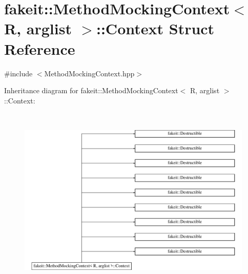 \hypertarget{structfakeit_1_1MethodMockingContext_1_1Context}{}\section{fakeit\+::Method\+Mocking\+Context$<$ R, arglist $>$\+::Context Struct Reference}
\label{structfakeit_1_1MethodMockingContext_1_1Context}


{\ttfamily \#include $<$Method\+Mocking\+Context.\+hpp$>$}

Inheritance diagram for fakeit\+::Method\+Mocking\+Context$<$ R, arglist $>$\+::Context\+:\begin{figure}[H]
\begin{center}
\leavevmode
\includegraphics[height=9.003216cm]{structfakeit_1_1MethodMockingContext_1_1Context}
\end{center}
\end{figure}
